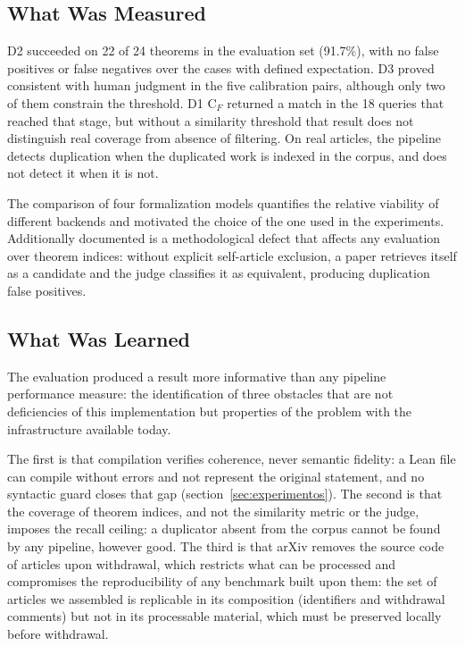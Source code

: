 \documentclass{article}
\theoremstyle{remark}
\begin{document}
\subsection{What Was Measured}

D2 succeeded on 22 of 24 theorems in the evaluation set (91.7\%), with no false positives or false negatives over the cases with defined expectation. D3 proved consistent with human judgment in the five calibration pairs, although only two of them constrain the threshold. D1 C$_F$ returned a match in the 18 queries that reached that stage, but without a similarity threshold that result does not distinguish real coverage from absence of filtering. On real articles, the pipeline detects duplication when the duplicated work is indexed in the corpus, and does not detect it when it is not.

The comparison of four formalization models quantifies the relative viability of different backends and motivated the choice of the one used in the experiments. Additionally documented is a methodological defect that affects any evaluation over theorem indices: without explicit self-article exclusion, a paper retrieves itself as a candidate and the judge classifies it as equivalent, producing duplication false positives.

\subsection{What Was Learned}

The evaluation produced a result more informative than any pipeline performance measure: the identification of three obstacles that are not deficiencies of this implementation but properties of the problem with the infrastructure available today.

The first is that compilation verifies coherence, never semantic fidelity: a Lean file can compile without errors and not represent the original statement, and no syntactic guard closes that gap (section~\ref{sec:experimentos}). The second is that the coverage of theorem indices, and not the similarity metric or the judge, imposes the recall ceiling: a duplicator absent from the corpus cannot be found by any pipeline, however good. The third is that arXiv removes the source code of articles upon withdrawal, which restricts what can be processed and compromises the reproducibility of any benchmark built upon them: the set of articles we assembled is replicable in its composition (identifiers and withdrawal comments) but not in its processable material, which must be preserved locally before withdrawal.
\end{document}
